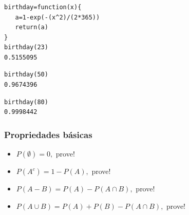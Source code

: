 \documentclass[14pt,aspectratio=1610]{beamer}
\begin{document}
\begin{frame}[fragile]{}
\frametitle{}
\begin{block}{}
\justifying
\begin{verbatim}
birthday=function(x){
   a=1-exp(-(x^2)/(2*365))
   return(a)
}
birthday(23)
0.5155095
\end{verbatim}
\pause

\begin{verbatim}
birthday(50) 
0.9674396
\end{verbatim}
\pause

\begin{verbatim}
birthday(80)
0.9998442
\end{verbatim}


\end{block}
\end{frame}

\begin{frame}{}
\frametitle{Propriedades básicas}
\begin{block}{}
\begin{itemize}
\item $P(\emptyset)=0,$ prove!\pause
\item $P(A^{c})=1-P(A),$ prove!\pause
\item $P(A-B)=P(A)-P(A\cap B),$ prove!\pause
\item $P(A\cup B)=P(A)+P(B)-P(A\cap B),$ prove!
\end{itemize}
\end{block}
\end{frame}
\end{document}
